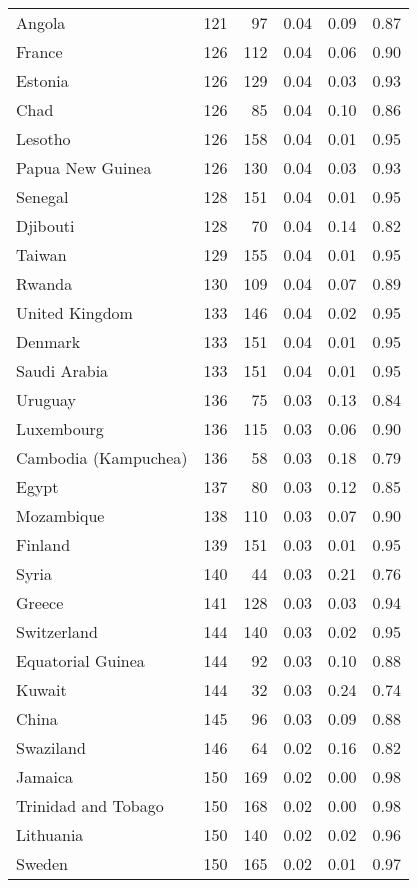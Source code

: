 \begin{longtable}[t]{lrrrrr}
\addlinespace
Angola & 121 & 97 & 0.04 & 0.09 & 0.87\\
France & 126 & 112 & 0.04 & 0.06 & 0.90\\
Estonia & 126 & 129 & 0.04 & 0.03 & 0.93\\
Chad & 126 & 85 & 0.04 & 0.10 & 0.86\\
Lesotho & 126 & 158 & 0.04 & 0.01 & 0.95\\
\addlinespace
Papua New Guinea & 126 & 130 & 0.04 & 0.03 & 0.93\\
Senegal & 128 & 151 & 0.04 & 0.01 & 0.95\\
Djibouti & 128 & 70 & 0.04 & 0.14 & 0.82\\
Taiwan & 129 & 155 & 0.04 & 0.01 & 0.95\\
Rwanda & 130 & 109 & 0.04 & 0.07 & 0.89\\
\addlinespace
United Kingdom & 133 & 146 & 0.04 & 0.02 & 0.95\\
Denmark & 133 & 151 & 0.04 & 0.01 & 0.95\\
Saudi Arabia & 133 & 151 & 0.04 & 0.01 & 0.95\\
Uruguay & 136 & 75 & 0.03 & 0.13 & 0.84\\
Luxembourg & 136 & 115 & 0.03 & 0.06 & 0.90\\
\addlinespace
Cambodia (Kampuchea) & 136 & 58 & 0.03 & 0.18 & 0.79\\
Egypt & 137 & 80 & 0.03 & 0.12 & 0.85\\
Mozambique & 138 & 110 & 0.03 & 0.07 & 0.90\\
Finland & 139 & 151 & 0.03 & 0.01 & 0.95\\
Syria & 140 & 44 & 0.03 & 0.21 & 0.76\\
\addlinespace
Greece & 141 & 128 & 0.03 & 0.03 & 0.94\\
Switzerland & 144 & 140 & 0.03 & 0.02 & 0.95\\
Equatorial Guinea & 144 & 92 & 0.03 & 0.10 & 0.88\\
Kuwait & 144 & 32 & 0.03 & 0.24 & 0.74\\
China & 145 & 96 & 0.03 & 0.09 & 0.88\\
\addlinespace
Swaziland & 146 & 64 & 0.02 & 0.16 & 0.82\\
Jamaica & 150 & 169 & 0.02 & 0.00 & 0.98\\
Trinidad and Tobago & 150 & 168 & 0.02 & 0.00 & 0.98\\
Lithuania & 150 & 140 & 0.02 & 0.02 & 0.96\\
Sweden & 150 & 165 & 0.02 & 0.01 & 0.97\\

\end{longtable}
